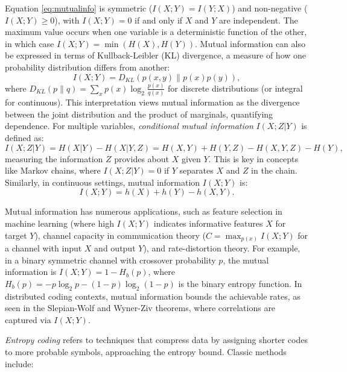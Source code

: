 Equation \ref{eq:mutualinfo} is symmetric ($I(X;Y) = I(Y;X)$) and non-negative ($I(X;Y) \geq 0$), with $I(X;Y) = 0$ if and only if $X$ and $Y$ are independent. The maximum value occurs when one variable is a deterministic function of the other, in which case $I(X;Y) = \min(H(X), H(Y))$. Mutual information can also be expressed in terms of Kullback-Leibler (KL) divergence, a measure of how one probability distribution differs from another:
\begin{equation}
    I(X;Y) = D_{KL}(p(x,y) \| p(x)p(y)),
\end{equation}
where $D_{KL}(p\|q) = \sum_x p(x) \log_2 \frac{p(x)}{q(x)}$ for discrete distributions (or integral for continuous). This interpretation views mutual information as the divergence between the joint distribution and the product of marginals, quantifying dependence. For multiple variables, \emph{conditional mutual information} $I(X;Z|Y)$ is defined as:
\begin{equation}
    I(X;Z|Y) = H(X|Y) - H(X|Y,Z) = H(X,Y) + H(Y,Z) - H(X,Y,Z) - H(Y),
\end{equation}
measuring the information $Z$ provides about $X$ given $Y$. This is key in concepts like Markov chains, where $I(X;Z|Y) = 0$ if $Y$ separates $X$ and $Z$ in the chain. Similarly, in continuous settings, mutual information $I(X;Y)$ is:
\begin{equation}
    I(X;Y) = h(X) + h(Y) - h(X,Y).
\end{equation}

Mutual information has numerous applications, such as feature selection in machine learning (where high $I(X;Y)$ indicates informative features $X$ for target $Y$), channel capacity in communication theory ($C = \max_{p(x)} I(X;Y)$ for a channel with input $X$ and output $Y$), and rate-distortion theory. For example, in a binary symmetric channel with crossover probability $p$, the mutual information is $I(X;Y) = 1 - H_b(p)$, where $H_b(p) = -p\log_2 p - (1-p)\log_2 (1-p)$ is the binary entropy function. In distributed coding contexts, mutual information bounds the achievable rates, as seen in the Slepian-Wolf and Wyner-Ziv theorems, where correlations are captured via $I(X;Y)$.

\emph{Entropy coding} refers to techniques that compress data by assigning shorter codes to more probable symbols, approaching the entropy bound. Classic methods include:

